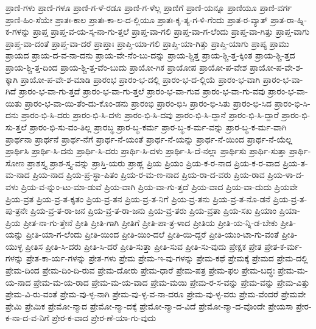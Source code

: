 {ಪ್ರಾಣಿ-ಗಳು
ಪ್ರಾಣಿ-ಗಳೂ
ಪ್ರಾಣಿ-ಗ-ಳೆ-ರಡೂ
ಪ್ರಾಣಿ-ಗ-ಳೆಲ್ಲ
ಪ್ರಾಣಿಗೆ
ಪ್ರಾಣಿ-ಯನ್ನೂ
ಪ್ರಾಣಿಯೂ
ಪ್ರಾಣಿ-ವರ್ಗ
ಪ್ರಾಣಿ-ಹಿಂ-ಸೆಯೇ
ಪ್ರಾತಃ-ಕಾಲ
ಪ್ರಾತಃ-ಕಾ-ಲ-ದ-ಲ್ಲಿಯೂ
ಪ್ರಾತಃ-ಕೃ-ತ್ಯ-ಗ-ಳಿ-ಗೆಂದು
ಪ್ರಾತ-ರ-ವ್ಯಾತ್
ಪ್ರಾತ-ರಾ-ಹ್ನಿ-ಕ-ಗಳನ್ನು
ಪ್ರಾಪ್ತ
ಪ್ರಾಪ್ತ-ವ-ಯ-ಸ್ಕ-ನಾ-ಗು-ತ್ತಲೆ
ಪ್ರಾಪ್ತ-ವಾ-ಗಲಿ
ಪ್ರಾಪ್ತ-ವಾ-ಗ-ಲೆಂದು
ಪ್ರಾಪ್ತ-ವಾ-ಗಿತ್ತು
ಪ್ರಾಪ್ತ-ವಾಗು
ಪ್ರಾಪ್ತ-ವಾ-ದಂತೆ
ಪ್ರಾಪ್ತ-ವಾ-ದರೆ
ಪ್ರಾಪ್ತಾಃ
ಪ್ರಾಪ್ತಿ-ಯಾ-ಗಲಿ
ಪ್ರಾಪ್ತಿ-ಯಾ-ಗಿತ್ತು
ಪ್ರಾಪ್ತಿ-ಯಾಗು
ಪ್ರಾಪ್ಯ
ಪ್ರಾಮು
ಪ್ರಾಯದ
ಪ್ರಾಯ-ದ-ವ-ನಾ-ದನು
ಪ್ರಾಯ-ವೇ-ನೆಂ-ಬು-ದನ್ನು
ಪ್ರಾಯ-ಶ್ಚಿತ್ತ
ಪ್ರಾಯ-ಶ್ಚಿ-ತ್ತ-ಕ್ಕಿಂತ
ಪ್ರಾಯ-ಶ್ಚಿ-ತ್ತದ
ಪ್ರಾಯ-ಶ್ಚಿ-ತ್ತ-ದಿಂದ
ಪ್ರಾಯ-ಶ್ಚಿ-ತ್ತ-ವೆಂ-ಬುದು
ಪ್ರಾಯೋ-ಗಿಕ
ಪ್ರಾಯೋಪ
ಪ್ರಾಯೋ-ಪ-ವೇಶ
ಪ್ರಾಯೋ-ಪ-ವೇ-ಶ-ಕ್ಕಾಗಿ
ಪ್ರಾಯೋ-ಪ-ವೇ-ಶ-ಮಾಡಿ
ಪ್ರಾರಂಭ
ಪ್ರಾರಂ-ಭ-ದಲ್ಲಿ
ಪ್ರಾರಂ-ಭ-ದ-ಲ್ಲಿಯೆ
ಪ್ರಾರಂ-ಭ-ವಾಗಿ
ಪ್ರಾರಂ-ಭ-ವಾ-ಗಿದೆ
ಪ್ರಾರಂ-ಭ-ವಾ-ಗು-ತ್ತದೆ
ಪ್ರಾರಂ-ಭ-ವಾ-ಗು-ತ್ತಲೆ
ಪ್ರಾರಂ-ಭ-ವಾ-ಗುವ
ಪ್ರಾರಂ-ಭ-ವಾ-ಗು-ವವು
ಪ್ರಾರಂ-ಭ-ವಾ-ಯಿತು
ಪ್ರಾರಂ-ಭ-ವಾ-ಯಿ-ತೆಂ-ದು-ಕೊಂ-ಡನು
ಪ್ರಾರಂಭಿ
ಪ್ರಾರಂ-ಭಿಸಿ
ಪ್ರಾರಂ-ಭಿ-ಸಿತು
ಪ್ರಾರಂ-ಭಿ-ಸಿದ
ಪ್ರಾರಂ-ಭಿ-ಸಿ-ದನು
ಪ್ರಾರಂ-ಭಿ-ಸಿ-ದರು
ಪ್ರಾರಂ-ಭಿ-ಸಿ-ದಳು
ಪ್ರಾರಂ-ಭಿ-ಸಿ-ದವು
ಪ್ರಾರಂ-ಭಿ-ಸಿ-ದ್ದಾನೆ
ಪ್ರಾರಂ-ಭಿ-ಸಿ-ದ್ದಾರೆ
ಪ್ರಾರಂ-ಭಿ-ಸು-ತ್ತಲೆ
ಪ್ರಾರಂ-ಭಿ-ಸು-ವಂ-ತಿಲ್ಲ
ಪ್ರಾರಬ್ಧ
ಪ್ರಾರ-ಬ್ಧ-ಕರ್ಮ
ಪ್ರಾರ-ಬ್ಧ-ಕ-ರ್ಮ-ವನ್ನು
ಪ್ರಾರ-ಬ್ಧ-ಕ-ರ್ಮ-ವಾಗಿ
ಪ್ರಾರ್ಥನಾ
ಪ್ರಾರ್ಥನೆ
ಪ್ರಾರ್ಥ-ನೆಗೆ
ಪ್ರಾರ್ಥ-ನೆ-ಯಂತೆ
ಪ್ರಾರ್ಥ-ನೆ-ಯನ್ನು
ಪ್ರಾರ್ಥ-ನೆ-ಯಿಂದ
ಪ್ರಾರ್ಥ-ನೆ-ಯೆಲ್ಲ
ಪ್ರಾರ್ಥಿಸಿ
ಪ್ರಾರ್ಥಿ-ಸಿ-ದನು
ಪ್ರಾರ್ಥಿ-ಸಿ-ದರು
ಪ್ರಾರ್ಥಿ-ಸಿ-ದಳು
ಪ್ರಾರ್ಥಿ-ಸಿ-ದೆ-ನಲ್ಲಾ
ಪ್ರಾರ್ಥಿಸು
ಪ್ರಾರ್ಥಿ-ಸುತ್ತಾ
ಪ್ರಾರ್ಥಿ-ಸೋಣ
ಪ್ರಾಶಸ್ತ್ಯ
ಪ್ರಾಶ-ಸ್ತ್ಯ-ವನ್ನು
ಪ್ರಾಸ್ತಿ-ಯರು
ಪ್ರಾಹ್ಣ
ಪ್ರಿಯ
ಪ್ರಿಯಂ
ಪ್ರಿಯ-ಕ-ರ-ನಾದ
ಪ್ರಿಯ-ಕ-ರ-ವಾದ
ಪ್ರಿಯ-ತ-ಮ-ನಾದ
ಪ್ರಿಯ-ನಾದ
ಪ್ರಿಯ-ಪ್ರ-ಸ್ಥಾ-ಪಿತಂ
ಪ್ರಿಯ-ರ-ಮ-ಣ-ನಾದ
ಪ್ರಿಯ-ರಾ-ದ-ವರು
ಪ್ರಿಯ-ರಾವ
ಪ್ರಿಯ-ಳಾ-ದ-ವಳು
ಪ್ರಿಯ-ವ-ನ್ನುಂ-ಟು-ಮಾ-ಡುವೆ
ಪ್ರಿಯ-ವಾಗಿ
ಪ್ರಿಯ-ವಾ-ಗು-ತ್ತದೆ
ಪ್ರಿಯ-ವಾದ
ಪ್ರಿಯ-ವಾ-ದುದು
ಪ್ರಿಯವೇ
ಪ್ರಿಯ-ವ್ರತ
ಪ್ರಿಯ-ವ್ರ-ತ-ಕೃತಂ
ಪ್ರಿಯ-ವ್ರ-ತನ
ಪ್ರಿಯ-ವ್ರ-ತ-ನಿಗೆ
ಪ್ರಿಯ-ವ್ರ-ತನು
ಪ್ರಿಯ-ವ್ರ-ತ-ನೊ-ಡನೆ
ಪ್ರಿಯ-ವ್ರ-ತ-ಪು-ತ್ರನೇ
ಪ್ರಿಯ-ವ್ರ-ತ-ರಾ-ಜನ
ಪ್ರಿಯ-ವ್ರ-ತ-ರಾ-ಜನು
ಪ್ರಿಯ-ವ್ರ-ತರು
ಪ್ರಿಯ-ವ್ರತಾ
ಪ್ರಿಯ-ಸಖ
ಪ್ರಿಯಾಂ
ಪ್ರಿಯಾ-ಪ್ರಿಯ
ಪ್ರೀತ-ನಾ-ಗು-ತ್ತೇನೆ
ಪ್ರೀತಿ
ಪ್ರೀತಿ-ಗಾಗಿ
ಪ್ರೀತಿಗೆ
ಪ್ರೀತಿ-ಪಾ-ತ್ರ-ಳಾದ
ಪ್ರೀತಿಯ
ಪ್ರೀತಿ-ಯ-ನ್ನಿ-ಡ-ಬೇಕು
ಪ್ರೀತಿ-ಯನ್ನು
ಪ್ರೀತಿ-ಯಾ-ಗ-ಲೆಂದು
ಪ್ರೀತಿ-ಯಿಂದ
ಪ್ರೀತಿ-ಯಿಂ-ದಲೆ
ಪ್ರೀತಿ-ಯಿ-ದ್ದರೆ
ಪ್ರೀತಿ-ಯುಂ-ಟಾ-ಗು-ವಂತೆ
ಪ್ರೀತಿ-ಯುಳ್ಳ
ಪ್ರೀತಿಸ
ಪ್ರೀತಿ-ಸಿ-ದರು
ಪ್ರೀತಿ-ಸಿ-ದರೆ
ಪ್ರೀತಿ-ಸುತ್ತಾ
ಪ್ರೀತಿ-ಸುವ
ಪ್ರೀತಿ-ಸು-ವುದು
ಪ್ರೇಕ್ಷಕ
ಪ್ರೇತ
ಪ್ರೇತ-ಕ-ರ್ಮ-ಗಳನ್ನು
ಪ್ರೇತ-ಕಾ-ರ್ಯ-ಗಳನ್ನು
ಪ್ರೇತ-ಗಳು
ಪ್ರೇಮ
ಪ್ರೇಮ-ಇ-ವು-ಗಳನ್ನು
ಪ್ರೇಮ-ಕಥೆ
ಪ್ರೇಮಕ್ಕೆ
ಪ್ರೇಮದ
ಪ್ರೇಮ-ದಲ್ಲಿ
ಪ್ರೇಮ-ದಿಂದ
ಪ್ರೇಮ-ದಿಂ-ದಿ-ರುವ
ಪ್ರೇಮ-ದೋರು
ಪ್ರೇಮ-ಧಾರೆ
ಪ್ರೇಮ-ಪತ್ರ
ಪ್ರೇಮ-ಫಲ
ಪ್ರೇಮ-ಬದ್ಧಃ
ಪ್ರೇಮ-ಮ-ಯ-ನಾದ
ಪ್ರೇಮ-ಮ-ಯ-ರಾದ
ಪ್ರೇಮ-ಮ-ಯ-ವಾದ
ಪ್ರೇಮ-ಮಯಿ
ಪ್ರೇಮ-ರ-ಸ-ವನ್ನು
ಪ್ರೇಮ-ವನ್ನು
ಪ್ರೇಮ-ವಿತ್ತು
ಪ್ರೇಮ-ವಿ-ರು-ವಂತೆ
ಪ್ರೇಮ-ವು-ಳ್ಳ-ನಾಗಿ
ಪ್ರೇಮ-ವು-ಳ್ಳ-ವ-ನಾ-ದರೂ
ಪ್ರೇಮ-ವು-ಳ್ಳ-ವರು
ಪ್ರೇಮ-ವೆಂದರೆ
ಪ್ರೇಮವೇ
ಪ್ರೇಮಿ
ಪ್ರೇಮಿಕ
ಪ್ರೇಮೋ-ನ್ಮಾದ
ಪ್ರೇಮೋ-ನ್ಮಾ-ದಕ್ಕೆ
ಪ್ರೇಮೋ-ನ್ಮಾ-ದ-ವಿದೆ
ಪ್ರೇಮೋ-ನ್ಮಾ-ದ-ವೊಂದೇ
ಪ್ರೇಯಸಾ
ಪ್ರೇರ-ಕ-ನಾ-ದ-ವ-ನಿಗೆ
ಪ್ರೇರ-ಕ-ವಾದ
ಪ್ರೇರ-ಣೆ-ಯಾ-ಗು-ವುದು
}
